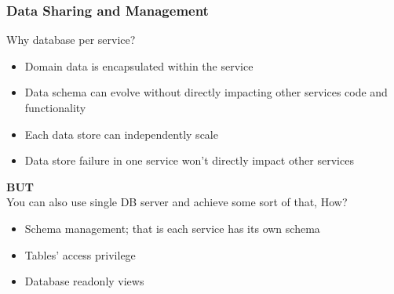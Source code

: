 \documentclass{beamer}
\begin{document}
		\begin{frame}
			\frametitle{Data Sharing and Management}
				Why database per service?
				\begin{itemize}
					\item \scriptsize{Domain data is encapsulated within the service }
					\item \scriptsize{Data schema can evolve without directly impacting other services code and functionality}
					\item \scriptsize{Each data store can independently scale}
					\item \scriptsize{Data store failure in one service won't directly impact other services}
				\end{itemize}
				
				\vspace{5mm}
				\textbf{BUT}\\
				\hspace{3mm} \scriptsize{You can also use single DB server and achieve some sort of that, How?} 
				\begin{itemize}
					\item<1-> \scriptsize{Schema management; that is each service has its own schema}
					\item<2-> \scriptsize{Tables' access privilege}
					\item<3-> \scriptsize{Database readonly views }
				\end{itemize}
				\vspace{100mm}
			\end{frame}
		
\end{document}
